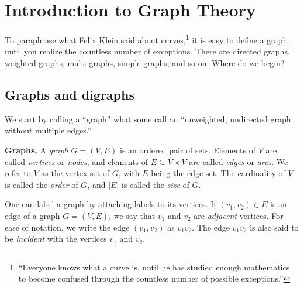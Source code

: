 
\chapter{Introduction to Graph Theory}

To paraphrase what Felix Klein said about curves,\footnote{
``Everyone knows what a curve is, until he has studied enough
mathematics to become confused through the countless number of
possible exceptions.''}
it is easy to define a graph until you realize the countless number of
exceptions. There are directed graphs, weighted graphs, multi-graphs,
simple graphs, and so on. Where do we begin?



\section{Graphs and digraphs}

We start by calling a ``graph'' what some call an ``unweighted,
undirected graph without multiple edges.''

\begin{definition}
\textbf{Graphs.}
A \emph{graph} $G = (V, E)$ is an ordered pair of sets. Elements of
$V$ are called \emph{vertices} or \emph{nodes}, and elements of
$E \subseteq V \times V$ are called \emph{edges} or \emph{arcs}. We
refer to $V$ as the vertex set of $G$, with $E$ being the edge
set. The cardinality of $V$ is called the \emph{order} of $G$, and
$|E|$ is called the \emph{size} of $G$.
\end{definition}

One can label a graph by attaching labels to its vertices. If $(v_1,
v_2) \in E$ is an edge of a graph $G = (V, E)$, we say that $v_1$ and
$v_2$ are \emph{adjacent} vertices. For ease of notation, we write the
edge $(v_1, v_2)$ as $v_1 v_2$. The edge $v_1 v_2$ is also said to be
\emph{incident} with the vertices $v_1$ and $v_2$.

